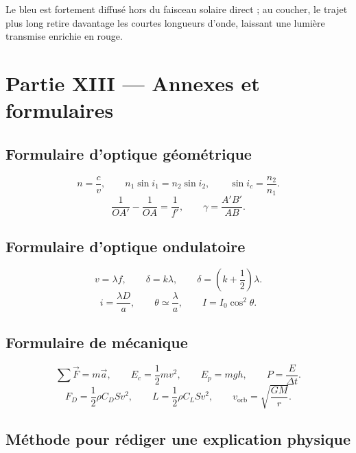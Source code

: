 \documentclass[11pt,a4paper]{article}
\begin{document}
\begin{corrigebox}
Le bleu est fortement diffusé hors du faisceau solaire direct ; au coucher, le trajet plus long retire davantage les courtes longueurs d'onde, laissant une lumière transmise enrichie en rouge.
\end{corrigebox}


\section{Partie XIII — Annexes et formulaires}

\subsection{Formulaire d'optique géométrique}

\begin{methodebox}
\[
n=\frac{c}{v},
\qquad
n_1\sin i_1=n_2\sin i_2,
\qquad
\sin i_c=\frac{n_2}{n_1}.
\]
\[
\frac{1}{OA'}-\frac{1}{OA}=\frac{1}{f'},
\qquad
\gamma=\frac{A'B'}{AB}.
\]
\end{methodebox}

\subsection{Formulaire d'optique ondulatoire}

\begin{methodebox}
\[
v=\lambda f,
\qquad
\delta=k\lambda,
\qquad
\delta=\left(k+\frac12\right)\lambda.
\]
\[
i=\frac{\lambda D}{a},
\qquad
\theta\simeq\frac{\lambda}{a},
\qquad
I=I_0\cos^2\theta.
\]
\end{methodebox}

\subsection{Formulaire de mécanique}

\begin{methodebox}
\[
\sum \vec F=m\vec a,
\qquad
E_c=\frac12mv^2,
\qquad
E_p=mgh,
\qquad
P=\frac{E}{\Delta t}.
\]
\[
F_D=\frac12\rho C_DSv^2,
\qquad
L=\frac12\rho C_LSv^2,
\qquad
v_{\mathrm{orb}}=\sqrt{\frac{GM}{r}}.
\]
\end{methodebox}

\subsection{Méthode pour rédiger une explication physique}
\end{document}
